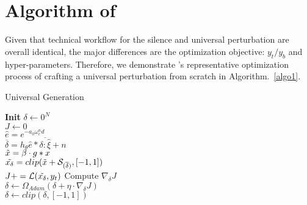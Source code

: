 \section{Algorithm of \alias}\label{append:algo1}
Given that technical workflow for the silence and universal perturbation are overall identical, the major differences are the optimization objective: $y_t/y_b$ and hyper-parameters. Therefore, we demonstrate \alias's representative optimization process of crafting a universal perturbation from scratch in Algorithm.~\ref{algo1}.

\begin{algorithm}[h]
	\caption{Universal \alias Generation}
	\label{algo1}
	\LinesNumbered
	\textbf{Init} $\delta \gets 0^N$\\
	{
		${J} \gets 0$\\
            {
                $\hat{e} = e^{-a_0 \omega_{c}^{n}d}$\\
                $\overline{\delta} = h_{\theta}\hat{e}\ast \overline{\delta:\hat{\xi}} + n$\\
                {
                    $\Tilde{x}=\beta\cdot g\ast x$\\
                    $\Tilde{x_{\delta}} = clip(\Tilde{x}+\mathcal{S}_{(\overline{\delta})}, [-1,1])$\\
                    $J+=\mathcal{L}(\Tilde{x_{\delta}}, y_t)$
                }
            }
            Compute ${\nabla}_\mathcal{\delta}J$\\
            $\delta \gets \Omega_{Adam}(\delta+\eta\cdot {\nabla}_\mathcal{\delta}J )$\\
            $\delta \gets clip(\delta, [-1,1])$\\
        }
	\normalsize
\end{algorithm}
\vfill\eject

